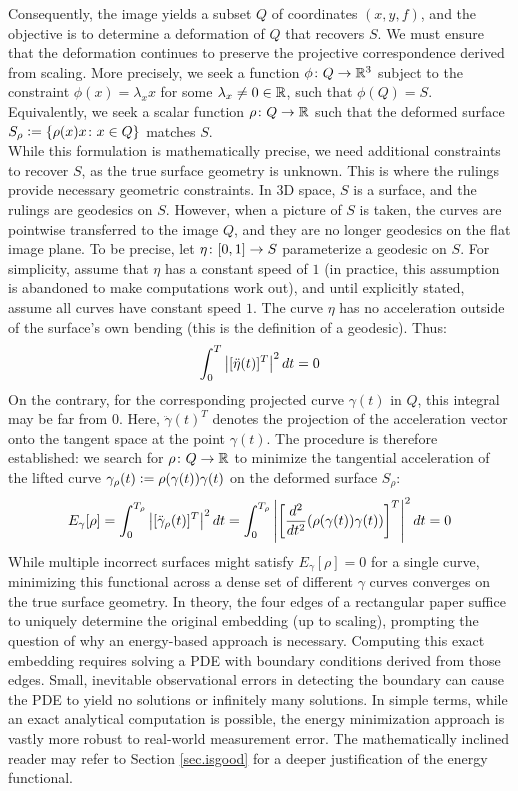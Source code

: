 \documentclass{article}
\begin{document}
Consequently, the image yields a subset $Q$ of coordinates $(x, y, f)$, and the objective is to determine a deformation of $Q$ that recovers $S$. We must ensure that the deformation continues to preserve the projective correspondence derived from scaling. More precisely, we seek a function $\phi \colon Q \to \mathbb{R}^3$ subject to the constraint $\phi(x) = \lambda_x x$ for some $\lambda_x\neq 0 \in \mathbb{R}$, such that $\phi(Q) = S$. Equivalently, we seek a scalar function $\rho \colon Q \to \mathbb{R}$ such that the deformed surface $S_\rho \vcentcolon= \{\rho(x) x \colon x \in Q\}$ matches $S$. \\

While this formulation is mathematically precise, we need additional constraints to recover $S$, as the true surface geometry is unknown. This is where the rulings provide necessary geometric constraints. In 3D space, $S$ is a surface, and the rulings are geodesics on $S$. However, when a picture of $S$ is taken, the curves are pointwise transferred to the image $Q$, and they are no longer geodesics on the flat image plane. To be precise, let $\eta \colon [0, 1] \to S$ parameterize a geodesic on $S$. For simplicity, assume that $\eta$ has a constant speed of $1$ (in practice, this assumption is abandoned to make computations work out), and until explicitly stated, assume all curves have constant speed $1$. The curve $\eta$ has no acceleration outside of the surface's own bending (this is the definition of a geodesic). Thus:
\[
  \int_0^T \left\lvert [\ddot \eta(t)]^T \right\rvert^2 dt = 0
\]
On the contrary, for the corresponding projected curve $\gamma(t)$ in $Q$, this integral may be far from $0$. Here, $\ddot \gamma(t)^T$ denotes the projection of the acceleration vector onto the tangent space at the point $\gamma(t)$. The procedure is therefore established: we search for $\rho \colon Q \to \mathbb{R}$ to minimize the tangential acceleration of the lifted curve $\gamma_\rho(t) \vcentcolon= \rho(\gamma(t)) \gamma(t)$ on the deformed surface $S_\rho$:
\[
  E_\gamma[\rho] = \int_0^{T_\rho} \left\lvert [\ddot \gamma_\rho(t)]^T \right\rvert^2 dt = \int_0^{T_\rho} \left\lvert \left[\frac{d^2}{dt^2}(\rho(\gamma(t))\gamma(t))\right]^T \right\rvert^2 dt = 0
\]
While multiple incorrect surfaces might satisfy $E_\gamma[\rho] = 0$ for a single curve, minimizing this functional across a dense set of different $\gamma$ curves converges on the true surface geometry. In theory, the four edges of a rectangular paper suffice to uniquely determine the original embedding (up to scaling), prompting the question of why an energy-based approach is necessary. Computing this exact embedding requires solving a PDE with boundary conditions derived from those edges. Small, inevitable observational errors in detecting the boundary can cause the PDE to yield no solutions or infinitely many solutions. In simple terms, while an exact analytical computation is possible, the energy minimization approach is vastly more robust to real-world measurement error. The mathematically inclined reader may refer to Section \ref{sec.isgood} for a deeper justification of the energy functional. \\
\end{document}
